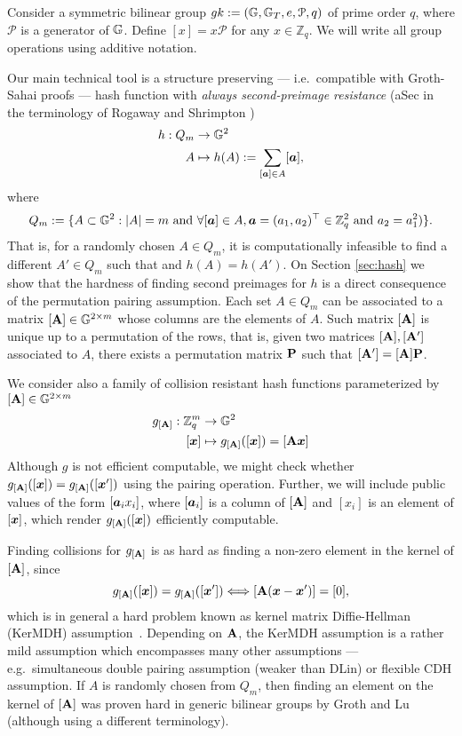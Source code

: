 Consider a symmetric bilinear group $gk:=(\mathbb{G},\mathbb{G}_T,e,\mathcal{P},q)$ of prime order $q$, where $\mathcal{P}$ is a generator of $\mathbb{G}$. Define $[x]=x\mathcal{P}$ for any $x\in\mathbb{Z}_q$.  We will write all group operations using additive notation.

Our main technical tool is a structure preserving --- i.e.~compatible with Groth-Sahai proofs --- hash function with \emph{always second-preimage resistance} (aSec in the terminology of Rogaway and Shrimpton \cite{FSE:RogShr04})
\begin{align*}
h : Q_m &\to \mathbb{G}^2\\
      A &\mapsto h(A) := \sum_{[{\boldsymbol{a}}]\in A} [{\boldsymbol{a}}],
\end{align*}
 where
$$
Q_m:= \{A\subset\mathbb{G}^2: |A|=m \text{ and }\forall [{\boldsymbol{a}}]\in A, {\boldsymbol{a}}=(a_1,a_2)^\top\in\mathbb{Z}_q^2 \text{ and } a_2=a_1^2)\}.
$$
That is, for a randomly chosen $A\in Q_m$, it is computationally infeasible to find a different $A'\in Q_m$ such that and $h(A)=h(A')$. On Section \ref{sec:hash} we show that the hardness of finding second preimages for $h$ is a direct consequence of the permutation pairing assumption.
Each set $A\in Q_m$  can be associated to a matrix $[\mathbf{{A}}]\in \mathbb{G}^{2\times m}$ whose columns are the elements of $A$. Such matrix $[\mathbf{{A}}]$ is unique up to a permutation of the rows, that is, given two matrices $[\mathbf{{A}}],[\mathbf{{A}}']$ associated to $A$, there exists a permutation matrix $\mathbf{{P}}$ such that $[\mathbf{{A}}'] = [\mathbf{{A}}]\mathbf{{P}}$.

We consider also a family of collision resistant hash functions parameterized by $[\mathbf{{A}}]\in\mathbb{G}^{2\times m}$
\begin{align*}
g_{[\matr{A}]} : \Z_q^m &\to \GG^2\\
           [\vecb{x}] &\mapsto g_{[\matr{A}]}([\vecb{x}]) = [\matr{A}\vecb{x}]
\end{align*}
Although $g$ is not efficient computable, we might check whether $g_{[\mathbf{{A}}]}([{\boldsymbol{x}}])=g_{[\mathbf{{A}}]}([{\boldsymbol{x}}'])$ using the pairing operation. Further, we will include public values of the form $[{\boldsymbol{a}}_ix_i]$, where $[{\boldsymbol{a}}_i]$ is a column of $[\mathbf{{A}}]$ and $[x_i]$ is an element of $[{\boldsymbol{x}}]$, which render  $g_{[\mathbf{{A}}]}([{\boldsymbol{x}}])$ efficiently computable.

Finding collisions for $g_{[\mathbf{{A}}]}$ is as hard as finding a non-zero element in the kernel of $[\mathbf{{A}}]$, since
$$
g_{[\mathbf{{A}}]}([{\boldsymbol{x}}]) = g_{[\mathbf{{A}}]}([{\boldsymbol{x}}']) \Longleftrightarrow [\mathbf{{A}}({\boldsymbol{x}}-{\boldsymbol{x}}')]=[0],
$$
which is in general a hard problem known as kernel matrix Diffie-Hellman (KerMDH) assumption~\cite{AC:MorRafVil16}. Depending on $\mathbf{{A}}$, the KerMDH assumption is a rather mild assumption which encompasses many other assumptions --- e.g.~simultaneous double pairing assumption (weaker than DLin) or flexible CDH assumption. If $A$ is randomly chosen from $Q_m$, then finding an element on the kernel of $[\mathbf{{A}}]$ was proven hard in generic bilinear groups by Groth and Lu \cite{AC:GroLu07} (although using a different terminology).


